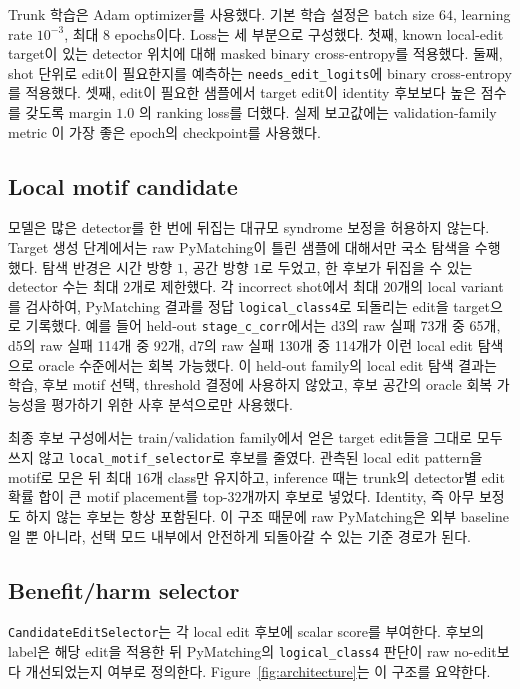 \documentclass[aps,prd,12pt,twocolumn,superscriptaddress,floatfix,longbibliography]{revtex4-2}
\begin{document}
Trunk 학습은 Adam optimizer를 사용했다. 기본 학습 설정은 batch size \(64\),
learning rate \(10^{-3}\), 최대 \(8\) epochs이다. Loss는 세 부분으로 구성했다.
첫째, known local-edit target이 있는 detector 위치에 대해 masked binary
cross-entropy를 적용했다. 둘째, shot 단위로 edit이 필요한지를 예측하는
\texttt{needs\_edit\_logits}에 binary cross-entropy를 적용했다. 셋째, edit이
필요한 샘플에서 target edit이 identity 후보보다 높은 점수를 갖도록 margin \(1.0\)
의 ranking loss를 더했다. 실제 보고값에는 validation-family metric
이 가장 좋은 epoch의 checkpoint를 사용했다.

\subsection{Local motif candidate}

모델은 많은 detector를 한 번에 뒤집는 대규모 syndrome 보정을 허용하지 않는다.
Target 생성 단계에서는 raw PyMatching이 틀린 샘플에 대해서만 국소 탐색을 수행했다.
탐색 반경은 시간 방향 \(1\), 공간 방향 \(1\)로 두었고, 한 후보가 뒤집을 수 있는
detector 수는 최대 \(2\)개로 제한했다. 각 incorrect shot에서 최대 \(20\)개의 local
variant를 검사하여, PyMatching 결과를 정답 \texttt{logical\_class4}로 되돌리는
edit을 target으로 기록했다. 예를 들어 held-out \texttt{stage\_c\_corr}에서는 d3의
raw 실패 73개 중 65개, d5의 raw 실패 114개 중 92개, d7의 raw 실패 130개 중
114개가 이런 local edit 탐색으로 oracle 수준에서는 회복 가능했다.
이 held-out family의 local edit 탐색 결과는 학습, 후보 motif 선택, threshold
결정에 사용하지 않았고, 후보 공간의 oracle 회복 가능성을 평가하기 위한 사후
분석으로만 사용했다.

최종 후보 구성에서는 train/validation family에서 얻은 target edit들을 그대로 모두
쓰지 않고 \texttt{local\_motif\_selector}로 후보를 줄였다. 관측된 local edit
pattern을 motif로 모은 뒤 최대 \(16\)개 class만 유지하고, inference 때는 trunk의 detector별 edit
확률 합이 큰 motif placement를 top-\(32\)개까지 후보로 넣었다. Identity, 즉 아무
보정도 하지 않는 후보는 항상 포함된다. 이 구조 때문에 raw PyMatching은 외부
baseline일 뿐 아니라, 선택 모드 내부에서 안전하게 되돌아갈 수 있는 기준 경로가
된다.

\subsection{Benefit/harm selector}

\texttt{CandidateEditSelector}는 각 local edit 후보에 scalar score를 부여한다.
후보의 label은 해당 edit을 적용한 뒤 PyMatching의 \texttt{logical\_class4} 판단이
raw no-edit보다 개선되었는지 여부로 정의한다.
Figure~\ref{fig:architecture}는 이 구조를 요약한다.
\end{document}
